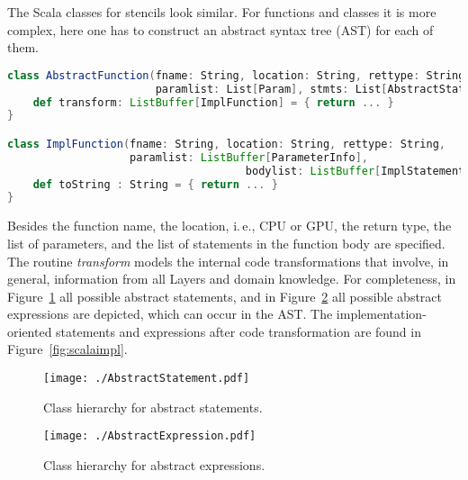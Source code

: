 \documentclass[onecolumn]{svjour3}
\begin{document}
The Scala classes for stencils look similar. For functions and classes it is more complex, here one has to construct an abstract syntax tree (AST) for each of them. 

\begin{minipage}{\textwidth}
\begin{lstlisting}[language=Scala]
class AbstractFunction(fname: String, location: String, rettype: String, 
                       paramlist: List[Param], stmts: List[AbstractStatement]) {
    def transform: ListBuffer[ImplFunction] = { return ... }
}

class ImplFunction(fname: String, location: String, rettype: String, 
                   paramlist: ListBuffer[ParameterInfo], 
									 bodylist: ListBuffer[ImplStatement]) {
    def toString : String = { return ... }							
}
\end{lstlisting}
\end{minipage}

Besides the function name, the location, i.\,e., CPU or GPU, the return type, the list of parameters, and the list of statements in the function body are specified. The routine \textit{transform} models the internal code transformations that involve, in general, information from all Layers and domain knowledge. For completeness, in Figure~\ref{fig:scalaabstractstate} all possible abstract statements, and in Figure~\ref{fig:scalaabstractexpr} all possible abstract expressions are depicted, which can occur in the AST. The implementation-oriented statements and expressions after code transformation are found in Figure~\ref{fig:scalaimpl}. 

\begin{figure}[ht!]
\begin{center}
\texttt{[image: ./AbstractStatement.pdf]}
\caption[Partitioning of a cell-centered grid into four sub-grids]{Class hierarchy for abstract statements.}
\label{fig:scalaabstractstate}
\end{center}
\end{figure}

\begin{figure}[ht!]
\begin{center}
\texttt{[image: ./AbstractExpression.pdf]}
\caption[Partitioning of a cell-centered grid into four sub-grids]{Class hierarchy for abstract expressions.}
\label{fig:scalaabstractexpr}
\end{center}
\end{figure}
\end{document}
